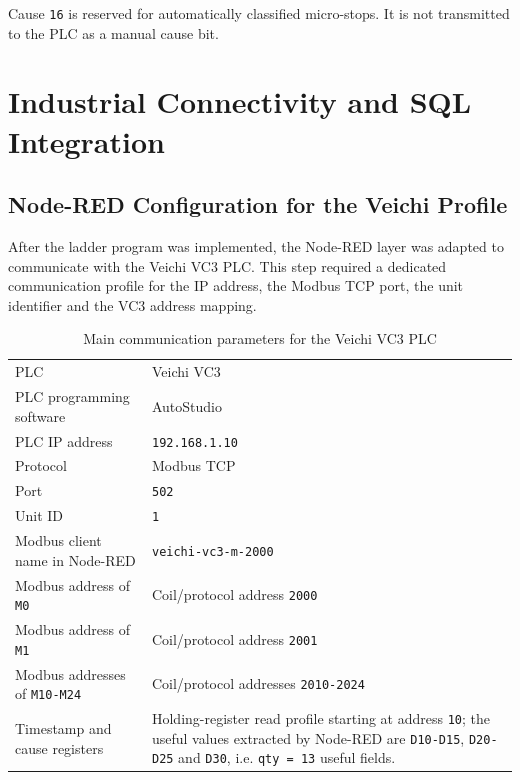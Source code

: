 Cause \texttt{16} is reserved for automatically classified micro-stops. It is not transmitted to the PLC as a manual cause bit.

\section{Industrial Connectivity and SQL Integration}

\subsection{Node-RED Configuration for the Veichi Profile}
After the ladder program was implemented, the Node-RED layer was adapted to communicate with the Veichi VC3 PLC. This step required a dedicated communication profile for the IP address, the Modbus TCP port, the unit identifier and the VC3 address mapping.

\begin{table}[H]
\centering
\caption{Main communication parameters for the Veichi VC3 PLC}
\begin{tabularx}{\textwidth}{|P{0.30\textwidth}|Y|}
\hline
{}
 &  \\
\hline
PLC & Veichi VC3 \\
\hline
PLC programming software & AutoStudio \\
\hline
PLC IP address & \texttt{192.168.1.10} \\
\hline
Protocol & Modbus TCP \\
\hline
Port & \texttt{502} \\
\hline
Unit ID & \texttt{1} \\
\hline
Modbus client name in Node-RED & \texttt{veichi-vc3-m-2000} \\
\hline
Modbus address of \texttt{M0} & Coil/protocol address \texttt{2000} \\
\hline
Modbus address of \texttt{M1} & Coil/protocol address \texttt{2001} \\
\hline
Modbus addresses of \texttt{M10-M24} & Coil/protocol addresses \texttt{2010-2024} \\
\hline
Timestamp and cause registers & Holding-register read profile starting at address \texttt{10}; the useful values extracted by Node-RED are \texttt{D10-D15}, \texttt{D20-D25} and \texttt{D30}, i.e. \texttt{qty = 13} useful fields. \\
\hline
\end{tabularx}
\end{table}

